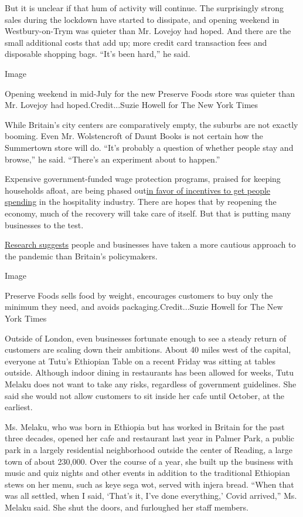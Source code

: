 But it is unclear if that hum of activity will continue. The
surprisingly strong sales during the lockdown have started to dissipate,
and opening weekend in Westbury-on-Trym was quieter than Mr. Lovejoy had
hoped. And there are the small additional costs that add up; more credit
card transaction fees and disposable shopping bags. ``It's been hard,''
he said.

Image

Opening weekend in mid-July for the new Preserve Foods store was quieter
than Mr. Lovejoy had hoped.Credit...Suzie Howell for The New York Times

While Britain's city centers are comparatively empty, the suburbs are
not exactly booming. Even Mr. Wolstencroft of Daunt Books is not certain
how the Summertown store will do. ``It's probably a question of whether
people stay and browse,'' he said. ``There's an experiment about to
happen.''

Expensive government-funded wage protection programs, praised for
keeping households afloat, are being phased
out\href{https://www.nytimes.com/2020/07/10/business/economy/britain-jobs-plan-layoffs.html}{in
favor of incentives to get people spending} in the hospitality industry.
There are hopes that by reopening the economy, much of the recovery will
take care of itself. But that is putting many businesses to the test.

\href{https://cepr.org/active/publications/discussion_papers/dp.php?dpno=15101}{Research
suggests} people and businesses have taken a more cautious approach to
the pandemic than Britain's policymakers.

Image

Preserve Foods sells food by weight, encourages customers to buy only
the minimum they need, and avoids packaging.Credit...Suzie Howell for
The New York Times

Outside of London, even businesses fortunate enough to see a steady
return of customers are scaling down their ambitions. About 40 miles
west of the capital, everyone at Tutu's Ethiopian Table on a recent
Friday was sitting at tables outside. Although indoor dining in
restaurants has been allowed for weeks, Tutu Melaku does not want to
take any risks, regardless of government guidelines. She said she would
not allow customers to sit inside her cafe until October, at the
earliest.

Ms. Melaku, who was born in Ethiopia but has worked in Britain for the
past three decades, opened her cafe and restaurant last year in Palmer
Park, a public park in a largely residential neighborhood outside the
center of Reading, a large town of about 230,000. Over the course of a
year, she built up the business with music and quiz nights and other
events in addition to the traditional Ethiopian stews on her menu, such
as keye sega wot, served with injera bread. ``When that was all settled,
when I said, `That's it, I've done everything,' Covid arrived,'' Ms.
Melaku said. She shut the doors, and furloughed her staff members.

